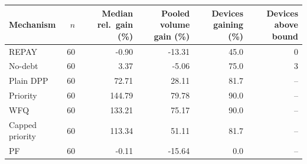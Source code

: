 \begin{tabular}{lrrrrr}
\toprule
Mechanism & $n$ & Median rel.\ gain (\%) & Pooled volume gain (\%) & Devices gaining (\%) & Devices above bound \\
\midrule
REPAY & 60 & -0.90 & -13.31 & 45.0 & 0 \\
No-debt & 60 & 3.37 & -5.06 & 75.0 & 3 \\
Plain DPP & 60 & 72.71 & 28.11 & 81.7 & -- \\
Priority & 60 & 144.79 & 79.78 & 90.0 & -- \\
WFQ & 60 & 133.21 & 75.17 & 90.0 & -- \\
Capped priority & 60 & 113.34 & 51.11 & 81.7 & -- \\
PF & 60 & -0.11 & -15.64 & 0.0 & -- \\
\bottomrule
\end{tabular}
